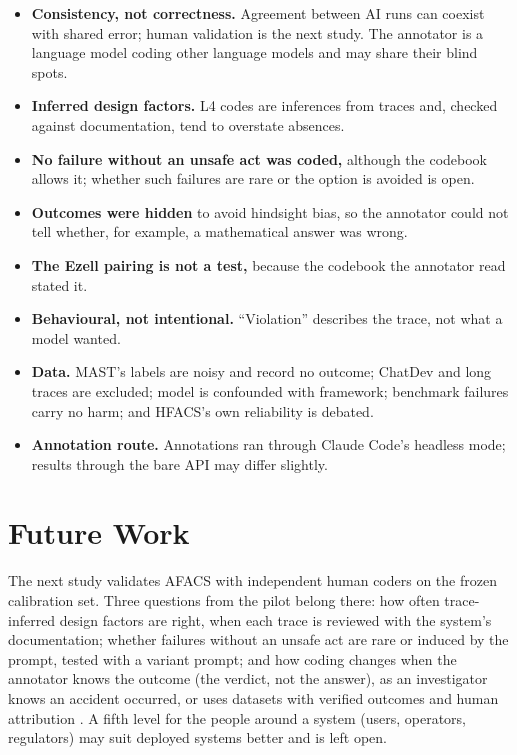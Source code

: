 \documentclass[10pt]{article}
\begin{document}
\begin{itemize}\setlength{\itemsep}{1pt}
  \item \textbf{Consistency, not correctness.} Agreement between AI runs can
  coexist with shared error; human validation is the next study. The annotator is
  a language model coding other language models and may share their blind spots.
  \item \textbf{Inferred design factors.} L4 codes are inferences from traces and,
  checked against documentation, tend to overstate absences.
  \item \textbf{No failure without an unsafe act was coded,} although the codebook
  allows it; whether such failures are rare or the option is avoided is open.
  \item \textbf{Outcomes were hidden} to avoid hindsight bias, so the annotator
  could not tell whether, for example, a mathematical answer was wrong.
  \item \textbf{The Ezell pairing is not a test,} because the codebook the
  annotator read stated it.
  \item \textbf{Behavioural, not intentional.} ``Violation'' describes the trace,
  not what a model wanted.
  \item \textbf{Data.} MAST's labels are noisy and record no outcome; ChatDev and
  long traces are excluded; model is confounded with framework; benchmark failures
  carry no harm; and HFACS's own reliability is debated.
  \item \textbf{Annotation route.} Annotations ran through Claude Code's headless
  mode; results through the bare API may differ slightly.
\end{itemize}

\section{Future Work}

The next study validates AFACS with independent human coders on the frozen
calibration set. Three questions from the pilot belong there: how often
trace-inferred design factors are right, when each trace is reviewed with the
system's documentation; whether failures without an unsafe act are rare or induced
by the prompt, tested with a variant prompt; and how coding changes when the
annotator knows the outcome (the verdict, not the answer), as an investigator knows
an accident occurred, or uses datasets with verified outcomes and human
attribution \citep{zhang2025whowhen}. A fifth level for the people around a system
(users, operators, regulators) may suit deployed systems better and is left open.
\end{document}
